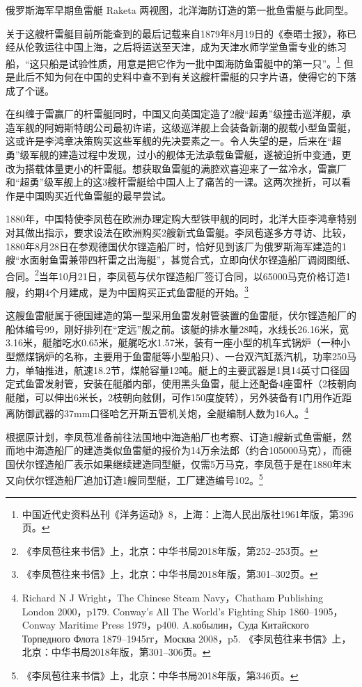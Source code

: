 \documentclass[12pt,UTF8]{ctexbook}
\begin{document}
俄罗斯海军早期鱼雷艇 Raketa 两视图，北洋海防订造的第一批鱼雷艇与此同型。

关于这艘杆雷艇目前所能查到的最后记载来自1879年8月19日的《泰晤士报》，称已经从伦敦运往中国上海，之后将运送至天津，成为天津水师学堂鱼雷专业的练习船，“这只船是试验性质，用意是把它作为一批中国海防鱼雷艇中的第一只”。\footnote{中国近代史资料丛刊《洋务运动》8，上海：上海人民出版社1961年版，第396页。} 但是此后不知为何在中国的史料中查不到有关这艘杆雷艇的只字片语，使得它的下落成了个谜。

在纠缠于雷赢厂的杆雷艇同时，中国又向英国定造了2艘“超勇”级撞击巡洋舰，承造军舰的阿姆斯特朗公司最初许诺，这级巡洋舰上会装备新潮的舰载小型鱼雷艇，这或许是李鸿章决策购买这些军舰的先决要素之一。令人失望的是，后来在“超勇”级军舰的建造过程中发现，过小的舰体无法承载鱼雷艇，遂被迫折中变通，更改为搭载体量更小的杆雷艇。想获取鱼雷艇的满腔欢喜迎来了一盆冷水，雷赢厂和“超勇”级军舰上的这3艘杆雷艇给中国人上了痛苦的一课。这两次挫折，可以看作是中国购买近代鱼雷艇的最早尝试。

1880年，中国特使李凤苞在欧洲办理定购大型铁甲舰的同时，北洋大臣李鸿章特别对其做出指示，要求设法在欧洲购买2艘新式鱼雷艇。李凤苞遂多方寻访、比较，1880年8月28日在参观德国伏尔铿造船厂时，恰好见到该厂为俄罗斯海军建造的1艘“水面射鱼雷兼带四杆雷之出海艇”，甚觉合式，立即向伏尔铿造船厂调阅图纸、合同。\footnote{《李凤苞往来书信》上，北京：中华书局2018年版，第252--253页。}当年10月21日，李凤苞与伏尔铿造船厂签订合同，以65000马克价格订造1艘，约期4个月建成，是为中国购买正式鱼雷艇的开始。\footnote{《李凤苞往来书信》上，北京：中华书局2018年版，第301--302页。}

这艘鱼雷艇属于德国建造的第一型采用鱼雷发射管装置的鱼雷艇，伏尔铿造船厂的船体编号99，刚好排列在“定远”舰之前。该艇的排水量28吨，水线长26.16米，宽3.16米，艇艏吃水0.65米，艇艉吃水1.57米，装有一座小型的机车式锅炉（一种小型燃煤锅炉的名称，主要用于鱼雷艇等小型船只）、一台双汽缸蒸汽机，功率250马力，单轴推进，航速18.2节，煤舱容量12吨。艇上的主要武器是1具14英寸口径固定式鱼雷发射管，安装在艇艏内部，使用黑头鱼雷，艇上还配备4座雷杆（2枝朝向艇艏，可以伸出6米长，2枝朝向舷侧，可作150度旋转），另外装备有1门用作近距离防御武器的37mm口径哈乞开斯五管机关炮，全艇编制人数为16人。\footnote{Richard N J Wright，The Chinese Steam Navy，Chatham Publishing London 2000，p179. Conway's All The World's Fighting Ship 1860--1905，Conway Maritime Press 1979，p400. \cyrillicfont A.кобылин，Суда Китайского Торпедного Флота 1879--1945гг，Москва 2008，p5. 《李凤苞往来书信》上，北京：中华书局2018年版，第301--306页。}

根据原计划，李凤苞准备前往法国地中海造船厂也考察、订造1艘新式鱼雷艇，然而地中海造船厂的建造类似鱼雷艇的报价为14万余法郎（约合105000马克），而德国伏尔铿造船厂表示如果继续建造同型艇，仅需5万马克，李凤苞于是在1880年末又向伏尔铿造船厂追加订造1艘同型艇，工厂建造编号102。\footnote{《李凤苞往来书信》上，北京：中华书局2018年版，第346页。}
\end{document}
